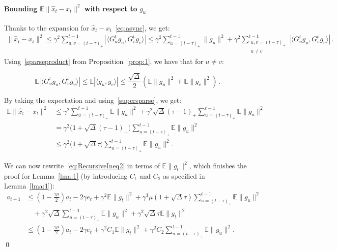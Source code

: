 \documentclass[twoside]{article}
\newcommand{\stepsize}{\gamma}
\newcommand{\strongconvex}{\mu}
\newcommand{\overlap}{\tau}
\newcommand{\sparsity}{\Delta}
\newcommand{\E}{\mathbb{E}}
\begin{document}
\paragraph{Bounding $\E\|\hat x_t - x_t\|^2$ with respect to $g_u$}
Thanks to the expansion for $\hat x_t - x_t$~\eqref{eq:async}, we get:
\begin{align*}
\|\hat x_t - x_t\|^2 
\leq \stepsize^2 \sum_{u, v=(t -\overlap)_+}^{t-1}|\langle G_u^t g_{u}, G_v^t g_{v}\rangle | 
\leq \stepsize^2 \sum_{u=(t -\overlap)_+}^{t-1}\|g_{u}\|^2 
	+ \stepsize^2 \sum_{\substack{u, v=(t-\overlap)_+ \\u\neq v}}^{t-1} |\langle G_u^t g_{u}, G_v^t g_{v}\rangle |  \, .
\end{align*}
Using~\eqref{sparseproduct} from Proposition~\ref{prop:1}, we have that for $u \neq v$:

\begin{equation} \label{supersparse}
\E |\langle G_u^t g_{u}, G_v^t g_{v}\rangle | 
\leq \E |\langle g_{u}, g_{v}\rangle | 
\leq \frac{\sqrt{\sparsity}}{2}(\E\|g_{u}\|^2 + \E\|g_{v}\|^2) \, .
\end{equation}

By taking the expectation and using~\eqref{supersparse}, we get:
\begin{align}
\E\|\hat x_t - x_t\|^2
&\leq \stepsize^2 \sum_{u=(t-\overlap)_+}^{t-1}\E\|g_{u}\|^2 
	+ \stepsize^2 \sqrt{\sparsity}(\overlap-1)_+ \sum_{u=(t-\overlap)_+}^{t-1}\E\|g_{u}\|^2 
\nonumber \\
&= \stepsize^2 \big(1+\sqrt{\sparsity}(\overlap-1)_+ \big)\sum_{u=(t-\overlap)_+}^{t-1}\E\|g_{u}\|^2 
\nonumber \\
&\leq \stepsize^2 \big(1+\sqrt{\sparsity}\overlap \big)\sum_{u=(t-\overlap)_+}^{t-1}\E\|g_{u}\|^2 .
\end{align}

We can now rewrite~\eqref{eq:RecursiveIneq2} in terms of $\E\|g_t\| ^2$, which finishes the proof for Lemma~\ref{lma:1} (by introducing $C_1$ and $C_2$ as specified in Lemma~\ref{lma:1}):
\begin{align}
a_{t+1} &\leq 
	(1 - \frac{\stepsize\strongconvex}{2}) a_t 
	- 2\stepsize e_t
	+ \stepsize^2 \E\|g_t\|^2
	+ \stepsize^3 \strongconvex(1+\sqrt{\sparsity}\overlap)\sum_{u=(t-\overlap)_+}^{t-1}\E\|g_{u}\|^2
\nonumber \\
	&\quad + \stepsize^2 \sqrt{\sparsity}\sum_{u=(t-\overlap)_+}^{t-1}\E\|g_{u}\|^2
	+ \stepsize^2 \sqrt{\sparsity}\overlap\E\|g_t\|^2
\nonumber \\
&\leq (1 - \frac{\stepsize\strongconvex}{2}) a_t 
	- 2\stepsize e_t
	+ \stepsize^2 C_1 \E\|g_t\|^2
	+ \stepsize^2 C_2 \sum_{u=(t-\overlap)_+}^{t-1}\E\|g_{u}\|^2 .
\end{align}
\qed
\end{document}
